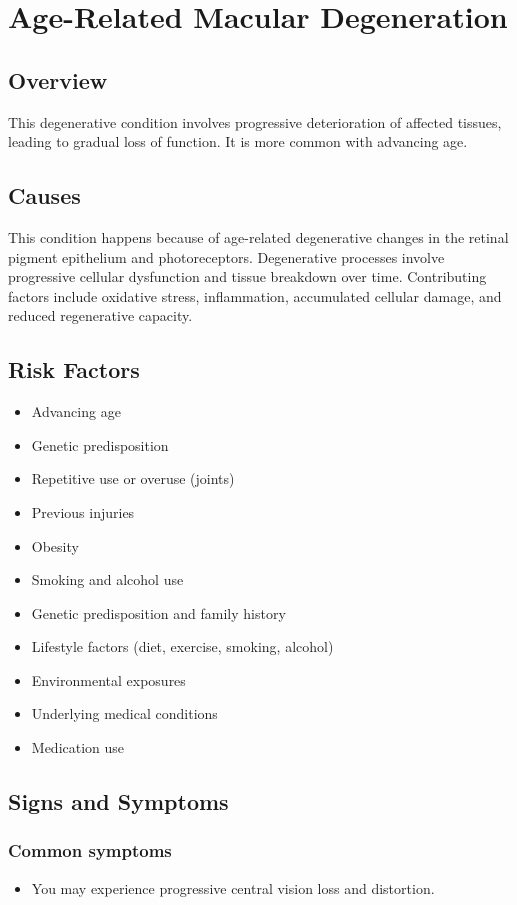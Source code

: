 \chapter{Age-Related Macular Degeneration}
\label{sec:Age-Related Macular Degeneration}

\section{Overview}
This degenerative condition involves progressive deterioration of affected tissues, leading to gradual loss of function. It is more common with advancing age.
\section{Causes}
This condition happens because of age-related degenerative changes in the retinal pigment epithelium and photoreceptors. Degenerative processes involve progressive cellular dysfunction and tissue breakdown over time. Contributing factors include oxidative stress, inflammation, accumulated cellular damage, and reduced regenerative capacity.    
\section{Risk Factors}

\begin{itemize}[noitemsep]
  \item Advancing age
  \item Genetic predisposition
  \item Repetitive use or overuse (joints)
  \item Previous injuries
  \item Obesity
  \item Smoking and alcohol use
  \item Genetic predisposition and family history
  \item Lifestyle factors (diet, exercise, smoking, alcohol)
  \item Environmental exposures
  \item Underlying medical conditions
  \item Medication use
\end{itemize}
\section{Signs and Symptoms}

\subsection{Common symptoms}
\begin{itemize}[noitemsep]
  \item You may experience progressive central vision loss and distortion. 
  \end{itemize}

